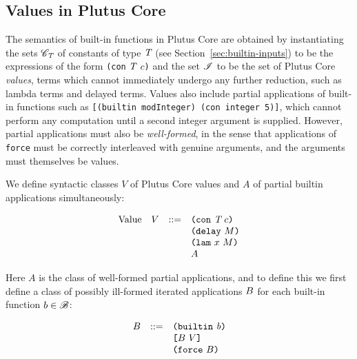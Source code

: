 \subsection{Values in Plutus Core}
\label{sec:uplc-values}
The semantics of built-in functions in Plutus Core are obtained by instantiating
the sets $\mathscr{C}_{\textit{T}}$ of constants of type $\textit{T}$ (see
Section~\ref{sec:builtin-inputs}) to be the expressions of the form
\texttt{(con} $\textit{T}$ $c$\texttt{)} and the set $\mathscr{I}$ to be the set of Plutus
Core \textit{values}, terms which cannot immediately undergo any further
reduction, such as lambda terms and delayed terms.  Values also include partial
applications of built-in functions such as \texttt{[(builtin modInteger) (con
    integer 5)]}, which cannot perform any computation until a second integer
argument is supplied.  However, partial applications must also be
\textit{well-formed}, in the sense that applications of \texttt{force} must be
correctly interleaved with genuine arguments, and the arguments must themselves
be values.

We define syntactic classes $V$ of Plutus Core values and $A$ of partial builtin
applications simultaneously:

\begin{minipage}{\linewidth}
    \centering
    \[\begin{array}{lrcl}
        \textrm{Value}  & V   & ::= & \texttt{(} \texttt{con} ~ \textit{T} ~ c \texttt{)} \\
                        &     &     & \texttt{(} \texttt{delay} ~ M \texttt{)} \\
                        &     &     & \texttt{(} \texttt{lam} ~ x ~ M  \texttt{)} \\
                        &     &     & A
    \end{array}\]
    \label{fig:untyped-cek-values}
\end{minipage}%
%

\medskip
\noindent Here $A$ is the class of well-formed partial applications, and to define
this we first define a class of possibly ill-formed iterated applications $B$ for
each built-in function $b \in \mathscr{B}$:

\begin{minipage}{\linewidth}
    \centering
  \[\begin{array}{lrl}
  B & ::= & \texttt{(} \texttt{builtin} ~ \mathit{b} \texttt{)}\\
       &     & \texttt{[} B ~ V \texttt{]}\\
       &    & \texttt{(} \texttt{force} ~ B \texttt{)}\\
    \end{array}\]
    \label{fig:partial-applications}
\end{minipage}%
%

